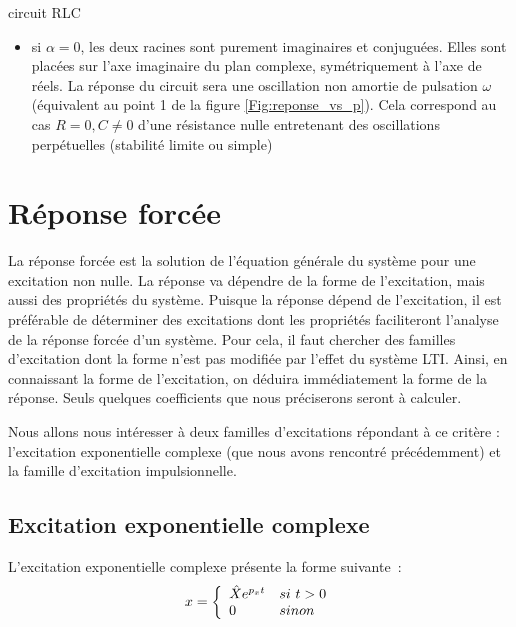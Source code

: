\begin{exemple}{circuit RLC}
\begin{itemize}
          racines sont conjuguées. Elles sont situées à gauche de
          l'axe des imaginaires dans le plan complexe. La réponse du circuit
          sera du type oscillation amortie de pulsation
          $\sqrt{\omega^{2}-\alpha^{2}}$ (équivalent au point 4 de la
          figure \ref{Fig:reponse_vs_p}).
        \item si $\alpha = 0$, les deux racines sont purement
          imaginaires et conjuguées. Elles sont placées sur l'axe
          imaginaire du plan complexe, symétriquement à l'axe de réels. La
          réponse du circuit sera une oscillation non amortie de
          pulsation $\omega$ (équivalent au point 1 de la figure
          \ref{Fig:reponse_vs_p}).  Cela correspond au cas 
           $R=0, C\neq 0$ d'une résistance nulle
          entretenant des oscillations perpétuelles (stabilité limite
          ou simple)
	\end{itemize}
      \end{exemple}
	
	\section{Réponse forcée}
	
	La réponse forcée est la solution de l'équation générale du
        système pour une excitation non nulle. La réponse va dépendre
        de la forme de l'excitation, mais aussi des propriétés du
        système. Puisque la réponse dépend de l'excitation, il est
        préférable de déterminer des excitations dont les propriétés
        faciliteront l'analyse de la réponse forcée d'un système. Pour
        cela, il faut chercher des familles d'excitation dont la forme
        n'est pas modifiée par l'effet du système LTI. Ainsi, en
        connaissant la forme de l'excitation, on déduira immédiatement
        la forme de la réponse. Seuls quelques coefficients que nous
        préciserons seront à calculer.
	
	Nous allons nous intéresser à deux familles d'excitations
        répondant à ce critère : l'excitation exponentielle complexe
        (que nous avons rencontré précédemment) et la famille
        d'excitation impulsionnelle.
	
	\subsection{Excitation exponentielle complexe}
	L'excitation exponentielle complexe présente la forme suivante~:
	\begin{equation}\label{eq:exc_expo_complexe}
          x =    \left \{
            \begin{array}{l l}
              \hat{X}  e^{p_{x}t}  & si~t>0 \\
              0   & sinon \\
            \end{array}
          \right .
	\end{equation}
	
